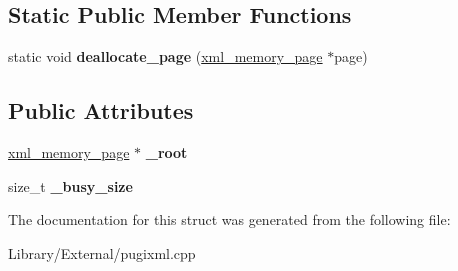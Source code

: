\subsection*{Static Public Member Functions}
\begin{DoxyCompactItemize}
\item 
\hypertarget{structxml__allocator_a1c6bfe15a257a094f55659f8d71c209e}{}static void {\bfseries deallocate\+\_\+page} (\hyperlink{structxml__memory__page}{xml\+\_\+memory\+\_\+page} $\ast$page)\label{structxml__allocator_a1c6bfe15a257a094f55659f8d71c209e}

\end{DoxyCompactItemize}
\subsection*{Public Attributes}
\begin{DoxyCompactItemize}
\item 
\hypertarget{structxml__allocator_a38082e85b23743620a257f997a00bb69}{}\hyperlink{structxml__memory__page}{xml\+\_\+memory\+\_\+page} $\ast$ {\bfseries \+\_\+root}\label{structxml__allocator_a38082e85b23743620a257f997a00bb69}

\item 
\hypertarget{structxml__allocator_a4908b4aaa8cbbc3bf936ab8a938053c0}{}size\+\_\+t {\bfseries \+\_\+busy\+\_\+size}\label{structxml__allocator_a4908b4aaa8cbbc3bf936ab8a938053c0}

\end{DoxyCompactItemize}


The documentation for this struct was generated from the following file\+:\begin{DoxyCompactItemize}
\item 
Library/\+External/pugixml.\+cpp\end{DoxyCompactItemize}
